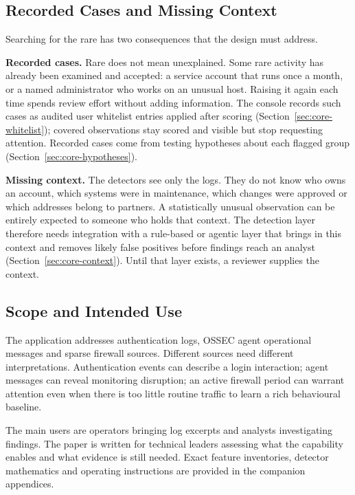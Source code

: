 \documentclass[11pt,a4paper]{article}
\begin{document}
\subsection{Recorded Cases and Missing Context}

Searching for the rare has two consequences that the design must address.

\textbf{Recorded cases.} Rare does not mean unexplained. Some rare activity has already been examined and accepted: a service account that runs once a month, or a named administrator who works on an unusual host. Raising it again each time spends review effort without adding information. The console records such cases as audited user whitelist entries applied after scoring (Section~\ref{sec:core-whitelist}); covered observations stay scored and visible but stop requesting attention. Recorded cases come from testing hypotheses about each flagged group (Section~\ref{sec:core-hypotheses}).

\textbf{Missing context.} The detectors see only the logs. They do not know who owns an account, which systems were in maintenance, which changes were approved or which addresses belong to partners. A statistically unusual observation can be entirely expected to someone who holds that context. The detection layer therefore needs integration with a rule-based or agentic layer that brings in this context and removes likely false positives before findings reach an analyst (Section~\ref{sec:core-context}). Until that layer exists, a reviewer supplies the context.

\subsection{Scope and Intended Use}

The application addresses authentication logs, OSSEC agent operational messages and sparse firewall sources. Different sources need different interpretations. Authentication events can describe a login interaction; agent messages can reveal monitoring disruption; an active firewall period can warrant attention even when there is too little routine traffic to learn a rich behavioural baseline.

The main users are operators bringing log excerpts and analysts investigating findings. The paper is written for technical leaders assessing what the capability enables and what evidence is still needed. Exact feature inventories, detector mathematics and operating instructions are provided in the companion appendices.
\end{document}
